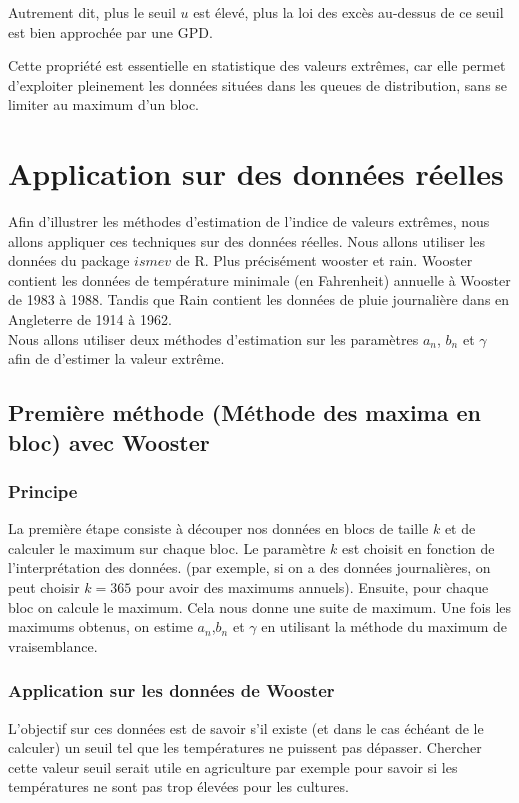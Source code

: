 \documentclass{article}
\begin{document}
Autrement dit, plus le seuil \(u\) est élevé, plus la loi des excès au-dessus de ce seuil est bien approchée par une GPD.

\medskip
Cette propriété est essentielle en statistique des valeurs extrêmes, car elle permet d’exploiter pleinement les données situées dans les queues de distribution, sans se limiter au maximum d’un bloc.

\newpage
\section{Application sur des données réelles}

Afin d'illustrer les méthodes d'estimation de l'indice de valeurs extrêmes, nous allons appliquer ces techniques sur des données réelles.
Nous allons utiliser les données du package $ismev$ de R. Plus précisément wooster et rain. Wooster contient les données de température minimale (en Fahrenheit) annuelle à Wooster de 1983 à 1988.
Tandis que Rain contient les données de pluie journalière dans en Angleterre de 1914 à 1962.
\\
Nous allons utiliser deux méthodes d'estimation sur les paramètres $a_n$, $b_n$ et $\gamma$ afin de d'estimer la valeur extrême.

\subsection{Première méthode (Méthode des maxima en bloc) avec Wooster}
\subsubsection{Principe}

La première étape consiste à découper nos données en blocs de taille $k$ et de calculer le maximum sur chaque bloc. Le paramètre
$k$ est choisit en fonction de l'interprétation des données. (par exemple, si on a des données journalières, on peut choisir $k=365$ pour avoir des maximums annuels).
Ensuite, pour chaque bloc on calcule le maximum. Cela nous donne une suite de maximum.
Une fois les maximums obtenus, on estime $a_n$,$b_n$ et $\gamma$ en utilisant la méthode du maximum de vraisemblance.

\subsubsection{Application sur les données de Wooster}
L'objectif sur ces données est de savoir s'il existe (et dans le cas échéant de le calculer) un seuil tel que les températures ne puissent pas dépasser.
Chercher cette valeur seuil serait utile en agriculture par exemple pour savoir si les températures ne sont pas trop élevées pour les cultures.
\end{document}
